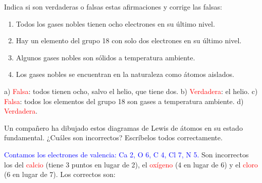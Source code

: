 \begin{exercise}
    Indica si son verdaderas o falsas estas afirmaciones y corrige las falsas:
    \begin{enumerate}[label=\alph*)]
        \item Todos los gases nobles tienen ocho electrones en su último nivel.
        \item Hay un elemento del grupo 18 con solo dos electrones en su último nivel.
        \item Algunos gases nobles son sólidos a temperatura ambiente.
        \item Los gases nobles se encuentran en la naturaleza como átomos aislados.
    \end{enumerate}
    \begin{solu}
        a) \textcolor{red}{Falsa}: todos tienen ocho, salvo el helio, que tiene dos. b) \textcolor{red}{Verdadera}: el helio. c) \textcolor{red}{Falsa}: todos los elementos del grupo 18 son gases a temperatura ambiente. d) \textcolor{red}{Verdadera}.
    \end{solu}
\end{exercise}

\begin{exercise}
    Un compañero ha dibujado estos diagramas de Lewis de átomos en su estado fundamental. ¿Cuáles son incorrectos? Escríbelos todos correctamente.
    \begin{center}
         \qquad
         \qquad
         \qquad
         \qquad
    \end{center}
    \begin{solu}
        \textcolor{blue}{Contamos los electrones de valencia: Ca 2, O 6, C 4, Cl 7, N 5.} Son incorrectos los del \textcolor{red}{calcio} (tiene 3 puntos en lugar de 2), el \textcolor{red}{oxígeno} (4 en lugar de 6) y el \textcolor{red}{cloro} (6 en lugar de 7). Los correctos son:
        \begin{center}
             \qquad
             \qquad
             \qquad
             \qquad
        \end{center}
    \end{solu}
\end{exercise}

